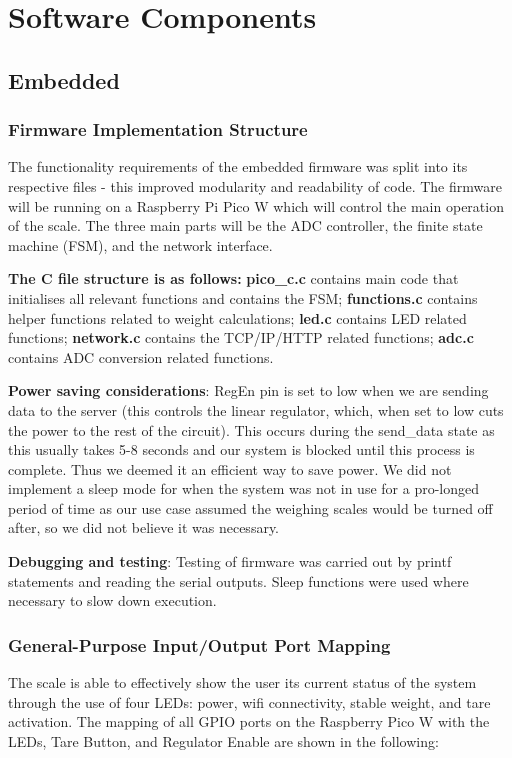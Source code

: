 
\chapter{Software Components}
\section{Embedded}
\subsection{Firmware Implementation Structure}
The functionality requirements of the embedded firmware was split into its respective files - this improved modularity and readability of code. The firmware will be running on a Raspberry Pi Pico W which will control the main operation of the scale. The three main parts will be the ADC controller, the finite state machine (FSM), and the network interface. 

\textbf{The C file structure is as follows:} 
\textbf{pico\_c.c} contains main code that initialises all relevant functions and contains the FSM; \textbf{functions.c} contains helper functions related to weight calculations; \textbf{led.c} contains LED related functions; \textbf{network.c} contains the TCP/IP/HTTP related functions; \textbf{adc.c} contains ADC conversion related functions.

\textbf{Power saving considerations}: RegEn pin is set to low when we are sending data to the server (this controls the linear regulator, which, when set to low cuts the power to the rest of the circuit). This occurs during the send\_data state as this usually takes 5-8 seconds and our system is blocked until this process is complete. Thus we deemed it an efficient way to save power. We did not implement a sleep mode for when the system was not in use for a pro-longed period of time as our use case assumed the weighing scales would be turned off after, so we did not believe it was necessary. 

\textbf{Debugging and testing}: Testing of firmware was carried out by printf statements and reading the serial outputs. Sleep functions were used where necessary to slow down execution. 

\subsection{General-Purpose Input/Output Port Mapping}
The scale is able to effectively show the user its current status of the system through the use of four LEDs: power, wifi connectivity, stable weight, and tare activation. The mapping of all GPIO ports on the Raspberry Pico W with  the LEDs, Tare Button, and Regulator Enable are shown in the following:

